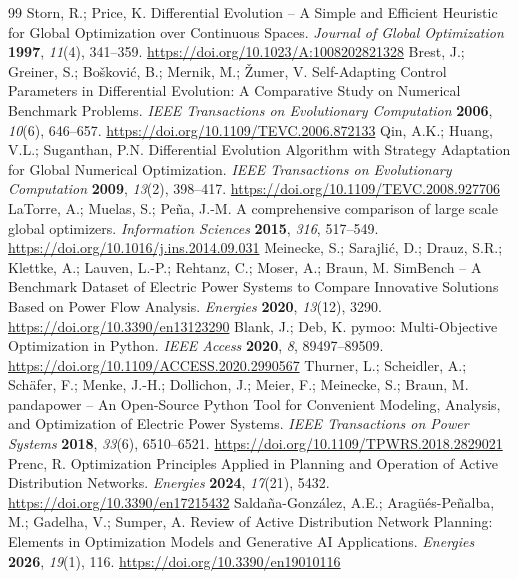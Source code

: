 \documentclass[energies,article,submit,moreauthors]{Definitions/mdpi}
\begin{document}
\begin{thebibliography}{99}
 Storn, R.; Price, K. Differential Evolution -- A Simple and Efficient Heuristic for Global Optimization over Continuous Spaces. \emph{Journal of Global Optimization} \textbf{1997}, \emph{11}(4), 341--359. \url{https://doi.org/10.1023/A:1008202821328}
 Brest, J.; Greiner, S.; Bo\v{s}kovi\'{c}, B.; Mernik, M.; \v{Z}umer, V. Self-Adapting Control Parameters in Differential Evolution: A Comparative Study on Numerical Benchmark Problems. \emph{IEEE Transactions on Evolutionary Computation} \textbf{2006}, \emph{10}(6), 646--657. \url{https://doi.org/10.1109/TEVC.2006.872133}
 Qin, A.K.; Huang, V.L.; Suganthan, P.N. Differential Evolution Algorithm with Strategy Adaptation for Global Numerical Optimization. \emph{IEEE Transactions on Evolutionary Computation} \textbf{2009}, \emph{13}(2), 398--417. \url{https://doi.org/10.1109/TEVC.2008.927706}
 LaTorre, A.; Muelas, S.; Pe\~{n}a, J.-M. A comprehensive comparison of large scale global optimizers. \emph{Information Sciences} \textbf{2015}, \emph{316}, 517--549. \url{https://doi.org/10.1016/j.ins.2014.09.031}
 Meinecke, S.; Sarajli\'{c}, D.; Drauz, S.R.; Klettke, A.; Lauven, L.-P.; Rehtanz, C.; Moser, A.; Braun, M. SimBench -- A Benchmark Dataset of Electric Power Systems to Compare Innovative Solutions Based on Power Flow Analysis. \emph{Energies} \textbf{2020}, \emph{13}(12), 3290. \url{https://doi.org/10.3390/en13123290}
 Blank, J.; Deb, K. pymoo: Multi-Objective Optimization in Python. \emph{IEEE Access} \textbf{2020}, \emph{8}, 89497--89509. \url{https://doi.org/10.1109/ACCESS.2020.2990567}
 Thurner, L.; Scheidler, A.; Sch\"{a}fer, F.; Menke, J.-H.; Dollichon, J.; Meier, F.; Meinecke, S.; Braun, M. pandapower -- An Open-Source Python Tool for Convenient Modeling, Analysis, and Optimization of Electric Power Systems. \emph{IEEE Transactions on Power Systems} \textbf{2018}, \emph{33}(6), 6510--6521. \url{https://doi.org/10.1109/TPWRS.2018.2829021}
 Prenc, R. Optimization Principles Applied in Planning and Operation of Active Distribution Networks. \emph{Energies} \textbf{2024}, \emph{17}(21), 5432. \url{https://doi.org/10.3390/en17215432}
 Salda\~{n}a-Gonz\'{a}lez, A.E.; Arag\"{u}\'{e}s-Pe\~{n}alba, M.; Gadelha, V.; Sumper, A. Review of Active Distribution Network Planning: Elements in Optimization Models and Generative AI Applications. \emph{Energies} \textbf{2026}, \emph{19}(1), 116. \url{https://doi.org/10.3390/en19010116}

\end{thebibliography}
\end{document}
